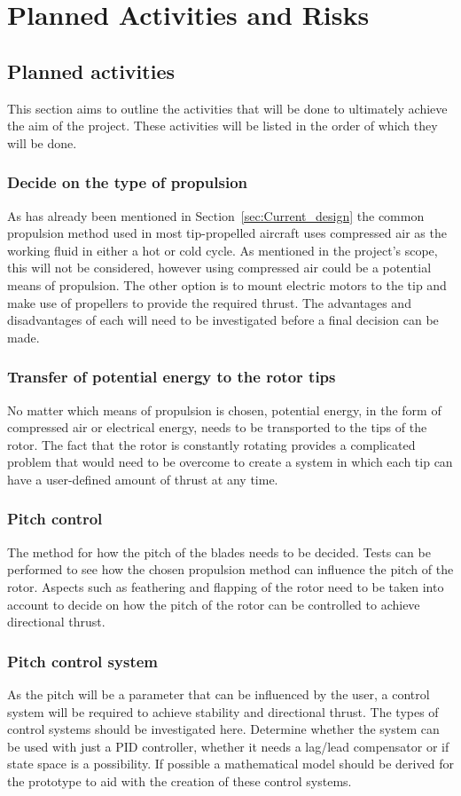\chapter{Planned Activities and Risks}
\section{Planned activities}
    This section aims to outline the activities that will be done to ultimately achieve the aim of the project. These activities will be listed in the order of which they will be done. 
    \subsection{Decide on the type of propulsion}
        As has already been mentioned in Section~\ref{sec:Current_design} the common propulsion method used in most tip-propelled aircraft uses compressed air as the working fluid in either a hot or cold cycle. As mentioned in the project's scope, this will not be considered, however using compressed air could be a potential means of propulsion. The other option is to mount electric motors to the tip and make use of propellers to provide the required thrust. The advantages and disadvantages of each will need to be investigated before a final decision can be made. 
    \subsection{Transfer of potential energy to the rotor tips}
        No matter which means of propulsion is chosen, potential energy, in the form of compressed air or electrical energy, needs to be transported to the tips of the rotor. The fact that the rotor is constantly rotating provides a complicated problem that would need to be overcome to create a system in which each tip can have a user-defined amount of thrust at any time. 
    \subsection{Pitch control}
        The method for how the pitch of the blades needs to be decided. Tests can be performed to see how the chosen propulsion method can influence the pitch of the rotor. Aspects such as feathering and flapping of the rotor need to be taken into account to decide on how the pitch of the rotor can be controlled to achieve directional thrust.
    \subsection{Pitch control system}
        As the pitch will be a parameter that can be influenced by the user, a control system will be required to achieve stability and directional thrust. The types of control systems should be investigated here. Determine whether the system can be used with just a PID controller, whether it needs a lag/lead compensator or if state space is a possibility. If possible a mathematical model should be derived for the prototype to aid with the creation of these control systems.
